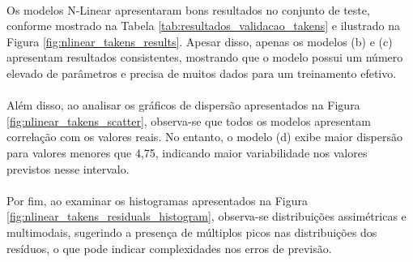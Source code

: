 \paragraph{} Os modelos \ac{N-Linear} apresentaram bons resultados no conjunto de teste, conforme mostrado na Tabela \ref{tab:resultados_validacao_takens} e ilustrado na Figura \ref{fig:nlinear_takens_results}. Apesar disso, apenas os modelos (b) e (c) apresentam resultados consistentes, mostrando que o modelo possui um número elevado de parâmetros e precisa de muitos dados para um treinamento efetivo.
\paragraph{} Além disso, ao analisar os gráficos de dispersão apresentados na Figura \ref{fig:nlinear_takens_scatter}, observa-se que todos os modelos apresentam correlação com os valores reais. No entanto, o modelo (d) exibe maior dispersão para valores menores que 4,75, indicando maior variabilidade nos valores previstos nesse intervalo.
\paragraph{} Por fim, ao examinar os histogramas apresentados na Figura \ref{fig:nlinear_takens_residuals_histogram}, observa-se distribuições assimétricas e multimodais, sugerindo a presença de múltiplos picos nas distribuições dos resíduos, o que pode indicar complexidades nos erros de previsão.


